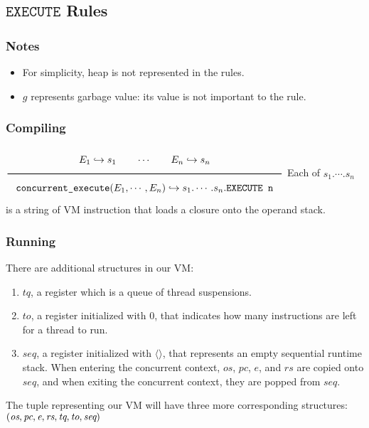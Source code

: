 \documentclass[11pt]{article}
\newcommand{\Rule}[2]{\genfrac{}{}{0.7pt}{}{{\setlength{\fboxrule}{0pt}\setlength{\fboxsep}{3mm}\fbox{$#1$}}}{{\setlength{\fboxrule}{0pt}\setlength{\fboxsep}{3mm}\fbox{$#2$}}}}
\newcommand{\translateaux}{\hookrightarrow}
\begin{document}
\subsection{\(\texttt{EXECUTE}\) Rules}
\label{sec:orga76ff96}

\subsubsection{Notes}
\label{sec:org406dee3}
\begin{itemize}
\item For simplicity, heap is not represented in the rules.
\item \(g\) represents garbage value: its value is not important to the rule.
\end{itemize}

\subsubsection{Compiling}
\label{sec:org536d6c2}
\(\Rule{E_1 \translateaux s_1 \qquad \cdots \qquad E_n \translateaux s_n}{\texttt{concurrent\_execute}(E_1, \cdots , E_n) \translateaux s_1. \cdots .s_n.\texttt{EXECUTE n}}\\\)
Each of \(s_1. \cdots .s_n\) is a string of VM instruction that loads a closure onto the operand stack.

\subsubsection{Running}
\label{sec:org729f4ea}
There are additional structures in our VM:
\begin{enumerate}
\item \(\textit{tq}\), a register which is a queue of thread suspensions.
\item \(\textit{to}\), a register initialized with \(0\), that indicates how many instructions are left for a thread to run.
\item \(\textit{seq}\), a register initialized with \(\langle \rangle\), that represents an empty sequential runtime stack. When entering the concurrent context, \(\textit{os}\), \(\textit{pc}\), \(\textit{e}\), and \(\textit{rs}\) are copied onto \(\textit{seq}\), and when exiting the concurrent context, they are popped from \(\textit{seq}\).
\end{enumerate}
The tuple representing our VM will have three more corresponding structures:
\((\textit{os}, \textit{pc}, \textit{e}, \textit{rs}, \textit{tq}, \textit{to}, \textit{seq})\\\)
\end{document}
